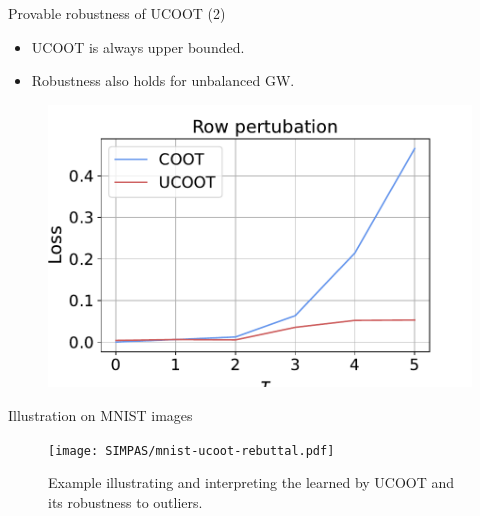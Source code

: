 \documentclass{beamer}
\begin{document}
\begin{frame}{Provable robustness of UCOOT (2)}
\begin{minipage}[t]{0.6\linewidth}
  \begin{itemize}
    \item UCOOT is always upper bounded.
    \item Robustness also holds for unbalanced GW.
  \end{itemize}
\end{minipage}%
\hfill%
\hspace{-6cm}
\begin{minipage}[t]{0.5\linewidth}
  \vspace{-0.3cm}
  \begin{figure}
    \centering
    \includegraphics[width=\linewidth, keepaspectratio=true]{SIMPAS/robustness_2.pdf}
  \end{figure}
\end{minipage}

\end{frame}

\begin{frame}{Illustration on MNIST images}
\scriptsize
\begin{figure}
    \centering
    \texttt{[image: SIMPAS/mnist-ucoot-rebuttal.pdf]}
    \vspace*{-1cm}
    \caption*{\scriptsize{Example illustrating and interpreting
    the {\color{red}{feature alignment $\pi^f$}} learned by UCOOT
    and its robustness to outliers.}}
\end{figure}
\end{frame}
\end{document}
